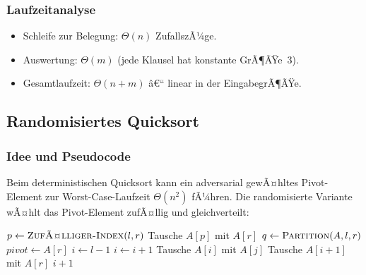 ﻿\documentclass[12pt,a4paper]{article}
\theoremstyle{definition}
\theoremstyle{plain}
\theoremstyle{remark}
\begin{document}
\subsubsection{Laufzeitanalyse}

\begin{itemize}
  \item Schleife zur Belegung: $\Theta(n)$ ZufallszÃ¼ge.
  \item Auswertung: $\Theta(m)$ (jede Klausel hat konstante GrÃ¶ÃŸe~3).
  \item Gesamtlaufzeit: $\Theta(n + m)$ â€“ linear in der EingabegrÃ¶ÃŸe.
\end{itemize}

\subsection{Randomisiertes Quicksort}
\label{subsec:rqs}

\subsubsection{Idee und Pseudocode}

Beim deterministischen Quicksort kann ein adversarial gewÃ¤hltes Pivot-Element
zur Worst-Case-Laufzeit $\Theta(n^2)$ fÃ¼hren. Die randomisierte Variante
wÃ¤hlt das Pivot-Element zufÃ¤llig und gleichverteilt:

\begin{algorithm}[H]
  \caption{Randomisiertes Quicksort}
  \label{alg:rqs}
  \begin{algorithmic}[1]
        \State \Return
      \EndIf
      \State $p \gets \textsc{ZufÃ¤lliger-Index}(l, r)$
      \State Tausche $A[p]$ mit $A[r]$
      \State $q \gets \textsc{Partition}(A, l, r)$
      \State {}
      \State {}
    \EndFunction
    \Statex
      \State $\mathit{pivot} \gets A[r]$
      \State $i \gets l - 1$
          \State $i \gets i+1$
          \State Tausche $A[i]$ mit $A[j]$
        \EndIf
      \EndFor
      \State Tausche $A[i+1]$ mit $A[r]$
      \State \Return $i+1$
    \EndFunction
  \end{algorithmic}
\end{algorithm}
\end{document}
